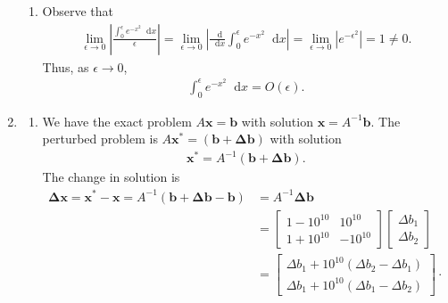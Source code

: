 \documentclass[10pt]{article}
\newcommand*{\dif}{\mathop{}\!\mathrm{d}}
\renewcommand\vec{\mathbf}
\begin{document}
\begin{enumerate}
\begin{enumerate}
      \item Observe that \begin{align*}
        \lim _{\epsilon \to 0} \left| \frac{\int_0^\epsilon e^{-x^2}\dif x}{\epsilon } \right| = \lim _{\epsilon \to 0} \left| \frac{\dif}{\dif x}\int_0^\epsilon e^{-x^2}\dif x \right| = \lim _{\epsilon \to 0} \left|  e^{-\epsilon^2} \right| = 1 \neq 0.
      \end{align*} Thus, as \(\epsilon  \to 0\), \begin{align*}
        \int_0^\epsilon e^{-x^2}\dif x = O(\epsilon).
      \end{align*}
    \end{enumerate}

    \item \begin{enumerate}
      \item We have the exact problem \(A\vec{x}=\vec{b}\) with solution \(\vec{x} = A^{-1}\vec{b}\). The perturbed problem is \(A\vec{x^\ast}=(\vec{b}+\vec{\Delta b})\) with solution \begin{align*}
          \vec{x^\ast} = A^{-1}(\vec{b}+\vec{\Delta b}).
      \end{align*} The change in solution is \begin{align}
        \vec{\Delta x} = \vec{x^\ast} - \vec{x} = A^{-1} \left(\vec{b} +  \vec{\Delta b} - \vec{b}\right) &= A^{-1} \vec{\Delta b} \nonumber \\ 
        &= \begin{bmatrix}
          1-10^{10} & 10^{10} \\ 1 + 10^{10} & -10^{10}
        \end{bmatrix} \begin{bmatrix}
          \Delta b_1 \\ \Delta b_2
        \end{bmatrix} \nonumber \\
        &= \begin{bmatrix}
          \Delta b_1 + 10^{10} \left( \Delta b_2 - \Delta b_1 \right) \\
          \Delta b_1 + 10^{10} \left( \Delta b_1 - \Delta b_2 \right)
        \end{bmatrix}\cdot  \label{eq:2pert}
      \end{align}


\end{enumerate}
\end{enumerate}
\end{document}
